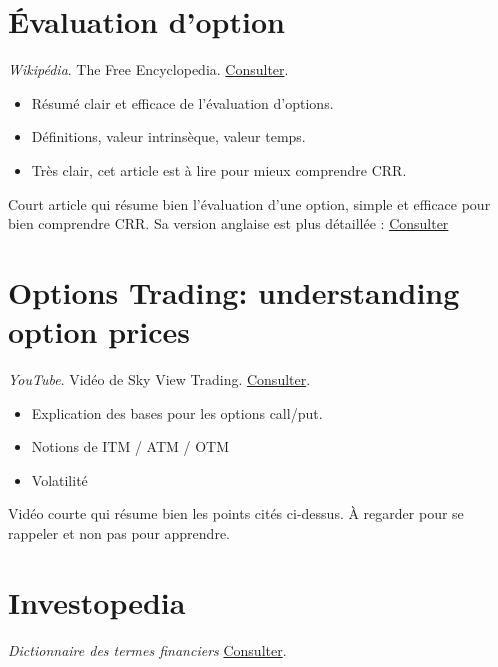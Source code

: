 \documentclass[a4paper,10pt]{article}
\begin{document}
\section*{Évaluation d'option}
{}
\textit{Wikipédia}. The Free Encyclopedia. \href{https://fr.wikipedia.org/wiki/Évaluation_d%27option}{Consulter}.
\begin{itemize}
    \item Résumé clair et efficace de l'évaluation d'options.
    \item Définitions, valeur intrinsèque, valeur temps.
    \item Très clair, cet article est à lire pour mieux comprendre CRR.
\end{itemize}
Court article qui résume bien l'évaluation d'une option, simple et efficace pour bien comprendre CRR. Sa version anglaise est plus détaillée : \href{https://en.wikipedia.org/wiki/Valuation_of_options}{Consulter}

\section*{Options Trading: understanding option prices}
{}
\textit{YouTube}. Vidéo de Sky View Trading. \href{https://youtu.be/MiybniIIvx0?si=ohfR6c83wdCrzKVJ}{Consulter}.
\begin{itemize}
    \item Explication des bases pour les options call/put.
    \item Notions de ITM / ATM / OTM
    \item Volatilité
\end{itemize}
Vidéo courte qui résume bien les points cités ci-dessus. À regarder pour se rappeler et non pas pour apprendre.

\section*{Investopedia}
{}
\textit{Dictionnaire des termes financiers} \href{https://www.investopedia.com/financial-term-dictionary-4769738}{Consulter}.
\end{document}
